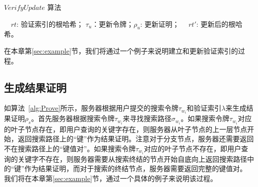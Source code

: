 \begin{algorithm}[ht]
  \caption{$VerifyUpdate$ 算法}
  \label{alg:verifyupdate}
  \begin{algorithmic}[1]
    \REQUIRE ~~{$rt$: 验证索引的根哈希； $\tau_u$：更新令牌；$\rho_u$: 更新证明；}
    \ENSURE ~~{$rt'$: 更新后的根哈希。}
                \ENDIF
              \ENDFOR
  \end{algorithmic}
\end{algorithm}

在本章第\ref{sec:example}节，我们将通过一个例子来说明建立和更新验证索引的过程。


\subsection{生成结果证明}
如算法~\ref{alg:Prove}所示，服务器根据用户提交的搜索令牌$\tau_{w_i}$和验证索引$\lambda$来生成结果证明$\rho_s$。首先服务器根据搜索令牌$\tau_{w_i}$来寻找搜索路径$\sigma_{w_i}$。如果搜索令牌$\tau_{w_i}$对应的叶子节点存在，即用户查询的关键字存在，则服务器从叶子节点的上一层节点开始，返回搜索路径上的“键”作为结果证明。注意对于分支节点，服务器还需要返回不在搜索路径上的“键值对”。如果搜索令牌$\tau_{w_i}$对应的叶子节点不存在，即用户查询的关键字不存在，则服务器需要从搜索终结的节点开始自底向上返回搜索路径中的“键”作为结果证明，而对于搜索的终结节点，服务器需要返回完整的键值对。
我们将在本章第\ref{sec:example}节，通过一个具体的例子来说明该过程。

